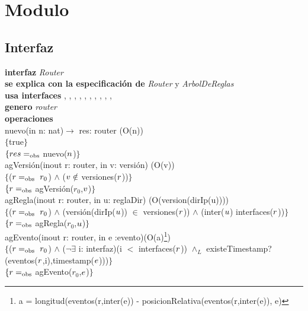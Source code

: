 \section*{Modulo }

\subsection*{Interfaz}
\textbf{interfaz} \textit{Router}\\
\textbf{se explica con la especificaci\'on de} \textit{Router} y \textit{ArbolDeReglas}\\
\textbf{usa interfaces} , , , , , , , , , , \\
\textbf{genero} \textit{router}\\

\textbf{operaciones}\\

nuevo(in n: nat)$\rightarrow$ res: router  \hfill(O(n)) \\
$\{$true$\}$\\
$\{{res} =_{\mathrm{obs}}$ nuevo(${n}$)$\}$\\

agVersi\'on(inout r: router, in v: versi\'on) \hfill(O(v))\\
$\{$(${r} =_{\mathrm{obs}}\ r_0$) $\wedge$ (${v} \notin$ versiones(${r}$))$\}$\\
$\{{r} =_{\mathrm{obs}}$ agVersi\'on($r_0$,${v}$)$\}$\\

agRegla(inout r: router, in u: reglaDir) \hfill(O(version(dirIp(u)))) \\
$\{$(${r} =_{\mathrm{obs}}\ r_0$) $\wedge$ (versi\'on(dirIp(${u}$)) $\in$ versiones(${r}$)) $\wedge$ (inter(${u}$) interfaces(${r}$))$\}$\\
$\{{r} =_{\mathrm{obs}}$ agRegla($r_0$,${u}$)$\}$\\

agEvento(inout r: router, in e :evento)\hfill(O(a)\footnote{a = longitud(eventos(r,inter(e)) - posicionRelativa(eventos(r,inter(e)), e)}) \\
$\{$(${r} =_{\mathrm{obs}}\ r_0$) $\wedge$ ($\neg \exists$ i: interfaz)(i $<$ interfaces(${r}$)) $\wedge_L$ existeTimestamp?(eventos(${r}$,i),timestamp(${e}$)))$\}$\\
$\{{r}=_{\mathrm{obs}}$ agEvento($r_0$,${e}$)$\}$\\

